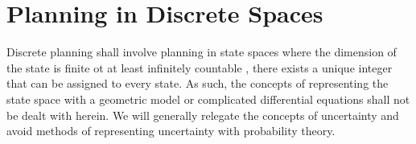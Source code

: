 \section{Planning in Discrete Spaces}
Discrete planning shall involve planning in state spaces where the dimension of the state is finite ot at least infinitely countable \ie, there exists a unique integer that can be assigned to every state. As such, the concepts of representing the state space with a geometric model or complicated differential equations shall not be dealt with herein. We will generally relegate the concepts of uncertainty and avoid methods of representing uncertainty with probability theory.